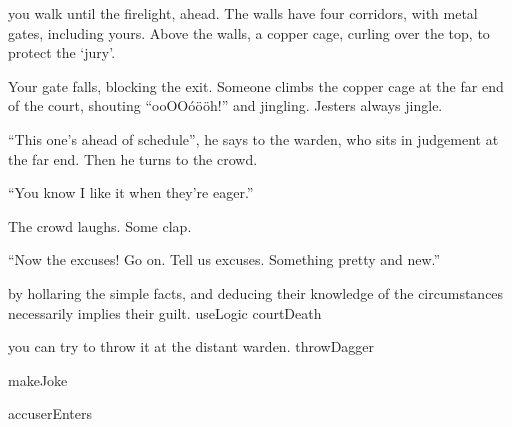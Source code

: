 you walk until the firelight, ahead.
The walls have four corridors, with metal gates, including yours.
Above the walls, a copper cage, curling over the top, to protect the `jury'.

Your gate falls, blocking the exit.
Someone climbs the copper cage at the far end of the \gls{court}, shouting ``ooOO\'o\"o\"oh!'' and jingling.
Jesters always jingle.

``This one's ahead of schedule'', he says to the \gls{warden}, who sits in judgement at the far end.
Then he turns to the crowd.

``You know I like it when they're eager.''

The crowd laughs.
Some clap.

``Now the excuses!
Go on.
Tell us excuses.
Something pretty and new.''

\begin{selectPath}
  {by hollaring the simple facts, and deducing their knowledge of the circumstances necessarily implies their guilt.}%
  {useLogic}
  {}%
  {courtDeath}

  {you can try to throw it at the distant \gls{warden}.}%
  {throwDagger}

  {}%
  {makeJoke}

  {}%
  {accuserEnters}
\end{selectPath}

